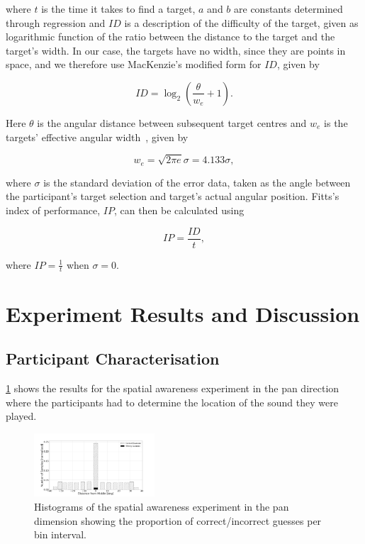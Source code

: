 \documentclass[sigconf, review=true, screen=true, anonymous=true]{acmart}
\begin{document}
\noindent
where $t$ is the time it takes to find a target, $a$ and $b$ are constants determined through regression and $ID$ is a description of the difficulty of the target, given as logarithmic function of the ratio between the distance to the target and the target's width.
In our case, the targets have no width, since they are points in space, and we therefore use MacKenzie's modified form for $ID$, given by

\begin{equation}
  \label{eq:fitts-id}
  ID = \log_2\left(\frac{\theta}{w_e} + 1\right).
\end{equation}

\noindent
Here $\theta$ is the angular distance between subsequent target centres and $w_e$ is the targets' effective angular width~\cite{welford1968fundamentals}, given by

\begin{equation}
  \label{eq:fitts-we}
  w_e = \sqrt{2\pi e}\sigma = 4.133\sigma,
\end{equation}

\noindent
where $\sigma$ is the standard deviation of the error data, taken as the angle between the participant's target selection and target's actual angular position.
Fitts's index of performance, $IP$, can then be calculated using 

\begin{equation}
  \label{eq:fitts-performance}
  IP = \frac{ID}{t},
\end{equation}

\noindent
where $IP = \frac{1}{t}$ when $\sigma=0$.

\section{Experiment Results and Discussion}
\label{sec:results}

\subsection{Participant Characterisation}
\label{sec:character}

\cref{fig:location-guesses} shows the results for the spatial awareness experiment in the pan direction where the participants had to determine the location of the sound they were played. 

\begin{figure}
  \centering
  \includegraphics[clip, trim=100 20 150 100, width=0.4\textwidth]{figures/location_guesses.png}
  \caption{Histograms of the spatial awareness experiment in the pan dimension showing the proportion of correct/incorrect guesses per bin interval. }
  \label{fig:location-guesses}
\end{figure}
\end{document}
